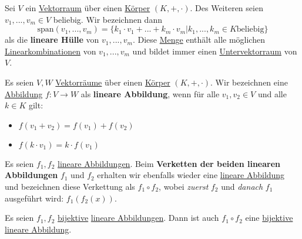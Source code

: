 \documentclass[../../main.tex]{subfiles}
\begin{document}
	\begin{definition}
		\label{def:LineareHülle}
		Sei $V$ ein \hyperref[def:Vektorraum]{Vektorraum} über einen \hyperref[def:Körper]{Körper} $(K,+,\cdot)$. Des Weiteren seien $v_1,...,v_m \in V$ beliebig. Wir bezeichnen dann $$\textrm{span}(v_1,...,v_m)= \{ k_1 \cdot v_1 + ... + k_m \cdot v_m | k_1,...,k_m \in K \textrm{beliebig} \}$$ als die \textbf{lineare Hülle} von $v_1,...,v_m$. Diese \hyperref[def:Menge]{Menge} enthält alle möglichen \hyperref[def:Linearkombination]{Linearkombinationen} von $v_1,...,v_m$ und bildet immer einen \hyperref[def:Untervektorraum]{Untervektorraum} von $V$. 
	\end{definition}

	\begin{definition}
		\label{def:LineareAbbildung}
		Es seien $V, W$ \hyperref[def:Vektorraum]{Vektorräume} über einen \hyperref[def:Körper]{Körper} $(K,+,\cdot)$. Wir bezeichnen eine \hyperref[def:Abbildung]{Abbildung} $f:V \rightarrow W$ als \textbf{lineare Abbildung}, wenn für alle $v_1,v_2 \in V$ und alle $k \in K$ gilt: 
		\begin{itemize}
			\item $f(v_1+v_2) = f(v_1) + f(v_2)$
			\item $f(k \cdot v_1) = k \cdot f(v_1)$
		\end{itemize}
	\end{definition}

	\begin{definition}
		Es seien $f_1,f_2$ \hyperref[def:LineareAbbildung]{lineare Abbildungen}. Beim \textbf{Verketten der beiden linearen Abbildungen} $f_1$ und $f_2$ erhalten wir ebenfalls wieder eine \hyperref[def:LineareAbbildung]{lineare Abbildung} und bezeichnen diese Verkettung als $f_1 \circ f_2$, wobei \textit{zuerst} $f_2$ und \textit{danach} $f_1$ ausgeführt wird: $f_1(f_2(x))$.
	\end{definition}

	\begin{theorem}
		Es seien $f_1,f_2$ \hyperref[def:Bijektiv]{bijektive} \hyperref[def:LineareAbbildung]{lineare Abbildungen}. Dann ist auch $f_1 \circ f_2$ eine \hyperref[def:Bijektiv]{bijektive} \hyperref[def:LineareAbbildung]{lineare Abbildung}.
	\end{theorem}
\end{document}
